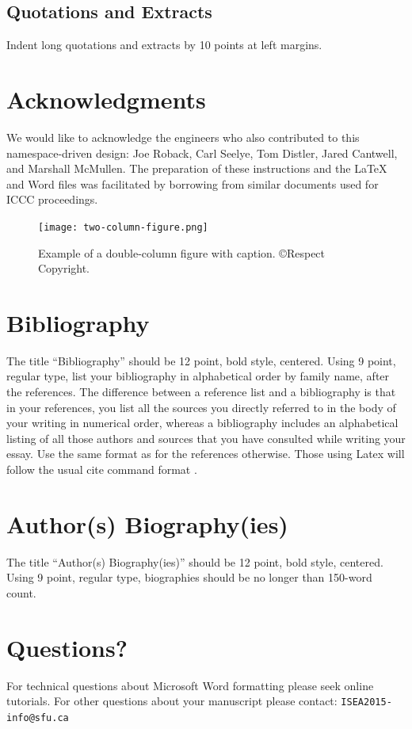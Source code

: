 \documentclass[letterpaper]{article}
\begin{document}
\subsection{Quotations and Extracts}
Indent long quotations and extracts by 10 points at left margins.

\section{Acknowledgments}
We would like to acknowledge the engineers who also contributed to this namespace-driven design: Joe Roback, Carl Seelye, Tom Distler, Jared Cantwell, and Marshall McMullen.
The preparation of these instructions and the \LaTeX{} and Word files was facilitated by borrowing from similar documents used for ICCC proceedings.

\begin{figure}
\texttt{[image: two-column-figure.png]}
\caption{Example of a double-column figure with caption. \copyright Respect Copyright.}
\end{figure}

\section{Bibliography}
The title ``Bibliography'' should be 12 point, bold style, centered. Using 9 point, regular type, list your bibliography in alphabetical order by family name, after the references. The difference between a reference list and a bibliography is that in your references, you list all the sources you directly referred to in the body of your writing in numerical order, whereas a bibliography includes an alphabetical listing of all those authors and sources that you have consulted while writing your essay. Use the same format as for the references otherwise. Those using Latex will follow the usual cite command format \cite{boden92}.

\section{Author(s) Biography(ies)}
The title ``Author(s) Biography(ies)'' should be 12 point, bold style, centered. Using 9 point, regular type, biographies should be no longer than 150-word count.

\section{Questions?}

For technical questions about Microsoft Word formatting please seek online tutorials. For other questions about your manuscript please contact: {\tt ISEA2015-info@sfu.ca}




\end{document}

